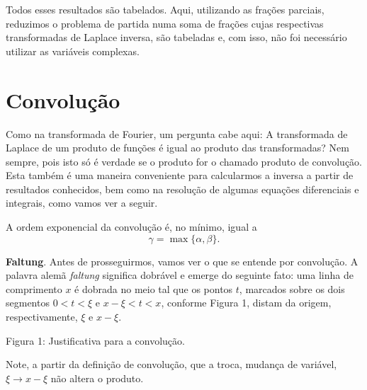 Todos esses resultados são tabelados. Aqui, utilizando as frações parciais, reduzimos o problema de partida numa soma de frações cujas respectivas transformadas de Laplace inversa, são tabeladas e, com isso, não foi necessário utilizar as variáveis complexas.


\section{Convolução}

Como na transformada de Fourier, um pergunta cabe aqui: A transformada de Laplace de um produto de funções é igual ao produto das transformadas? Nem sempre, pois isto só é verdade se o produto for o chamado produto de convolução. Esta também é uma maneira conveniente para calcularmos a inversa a partir de resultados conhecidos, bem como na resolução de algumas equações diferenciais e integrais, como vamos ver a seguir.

\definicao{Produto de convolução de Laplace}{def:aula04.13}{%
Sejam $f(t)$ e $g(t)$ duas funções de ordens exponenciais $\alpha$  e $\beta$, respectivamente, no intervalo $[0,\infty)$. Definimos o produto de convolução (ou apenas, convolução) das funções $f(t)$ e $g(t)$, denotado por $f \star g$, como a função $h(t)$ dada por
$$h(t) \equiv (f \star g)(t) = \int_{0}^{t} f(t - \tau)g(\tau) d\tau.$$
}

A ordem exponencial da convolução é, no mínimo, igual a
$$\gamma = \max\{\alpha, \beta\}.$$

\textbf{Faltung}. Antes de prosseguirmos, vamos ver o que se entende por convolução. A palavra alemã \textit{faltung} significa dobrável e emerge do seguinte fato: uma linha de comprimento $x$ é dobrada no meio tal que os pontos $t$, marcados sobre os dois segmentos $0 < t < \xi$ e $x - \xi < t < x$, conforme Figura 1, distam da origem, respectivamente, $\xi$ e $x - \xi$.


Figura 1: Justificativa para a convolução.


Note, a partir da definição de convolução, que a troca, mudança de variável, $\xi \to x - \xi$ não altera o produto.



